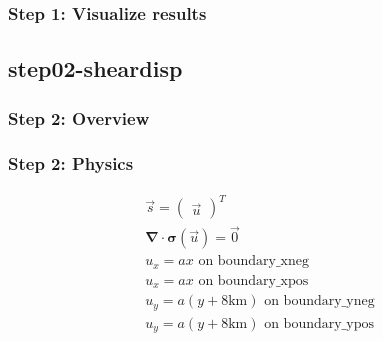 \documentclass[aspectratio=169]{beamer}
\begin{document}
\begin{frame}
  \frametitle{Step 1: Visualize results}

    
\end{frame}


\subsection{step02-sheardisp}

\begin{frame}
  \frametitle{Step 2: Overview}

      
\end{frame}


\begin{frame}[t]
  \frametitle{Step 2: Physics}
  \summary{}

  \begin{minipage}{0.35\textwidth}
    {\scriptsize
    \begin{gather*}
      \vec{s} = \left(\begin{array}{c} \vec{u} \end{array}\right)^T \\
      \boldsymbol{\nabla} \cdot \boldsymbol{\sigma}(\vec{u}) = \vec{0} \\
      u_x = ax \text{ on boundary\_xneg} \\
      u_x = ax \text{ on boundary\_xpos} \\
      u_y = a(y+8\mathrm{km}) \text{ on boundary\_yneg} \\
      u_y = a(y+8\mathrm{km}) \text{ on boundary\_ypos}
    \end{gather*}}
  \end{minipage}
  \hfill
  \begin{minipage}{0.55\textwidth}
  \end{minipage}
      
\end{frame}
\end{document}
